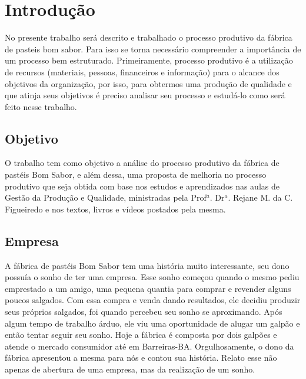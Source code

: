 \chapter[Introdução]{Introdução}

No presente trabalho será descrito e trabalhado o processo produtivo da fábrica de pasteis bom sabor. Para isso se torna necessário compreender a importância de um processo bem estruturado. Primeiramente, processo produtivo é a utilização de recursos (materiais, pessoas, financeiros e informação) para o alcance dos objetivos da organização, por isso, para obtermos uma produção de qualidade e que atinja seus objetivos é preciso analisar seu processo e estudá-lo como será feito nesse trabalho.

\section{Objetivo}

O trabalho tem como objetivo a análise do processo produtivo da fábrica de pastéis Bom Sabor, e além dessa, uma proposta de melhoria no processo produtivo que seja obtida com base nos estudos e aprendizados nas aulas de Gestão da Produção e Qualidade, ministradas pela Prof$^{a}$. Dr$^{a}$. Rejane M. da C. Figueiredo e nos textos, livros e vídeos postados pela mesma.

\section{Empresa}

A fábrica de pastéis Bom Sabor tem uma história muito interessante, seu dono possuía o sonho de ter uma empresa. Esse sonho começou quando o mesmo pediu emprestado a um amigo, uma pequena quantia para comprar e revender alguns poucos salgados. Com essa compra e venda dando resultados, ele decidiu produzir seus próprios salgados, foi quando percebeu seu sonho se aproximando. Após algum tempo de trabalho árduo, ele viu uma oportunidade de alugar um galpão e então tentar seguir seu sonho. Hoje a fábrica é composta por dois galpões e atende o mercado consumidor até em Barreiras-BA. Orgulhosamente, o dono da fábrica apresentou a mesma para nós e contou sua história. Relato esse não apenas de abertura de uma empresa, mas da realização de um sonho.